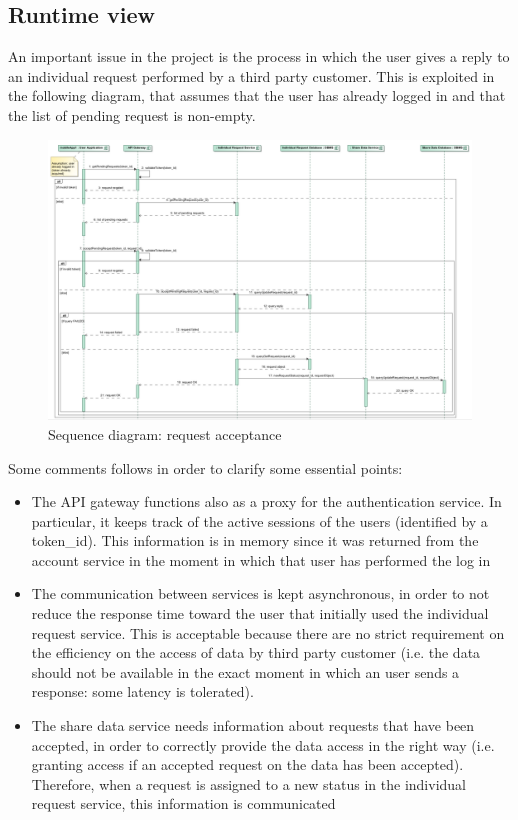 \subsection{Runtime view}
An important issue in the project is the process in which the user gives a reply to an individual request
performed by a third party customer. 
This is exploited in the following diagram, that assumes that the user
has already logged in and that the list of pending request is non-empty.

\begin{figure}[H]
\includegraphics[width=\linewidth]{Images/requestacceptance.pdf}
\caption{ Sequence diagram: request acceptance }
\label{fig:requestacceptance}
\end{figure}

Some comments follows in order to clarify some essential points:
\begin{itemize}
\item The API gateway functions also as a proxy for the authentication service. In particular, it keeps track of the active sessions of the
users (identified by a token\_id). This information is in memory since
it was returned from the account service in the moment in which that user has performed the log in
\item The communication between services is kept asynchronous, in order to not reduce the response time 
toward the user that initially used the individual request service. This is acceptable because there are
no strict requirement on the efficiency on the access of data by third party customer (i.e. the data should
not be available in the exact moment in which an user sends a response: some latency is tolerated). 
\item The share data service needs information about requests that have been accepted, in order to correctly
provide the data access in the right way (i.e. granting access if an accepted request on the data has been 
accepted). Therefore, when a request is assigned to a new status in the individual request service, this information is communicated
\end{itemize}


